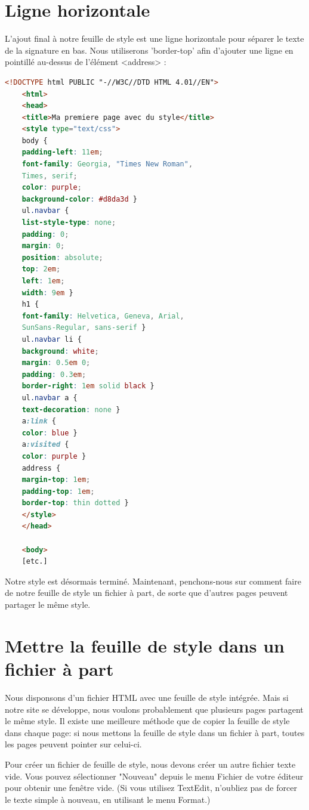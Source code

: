 \section{Ligne horizontale}
L'ajout final à notre feuille de style est une ligne horizontale pour séparer le texte de la signature en bas. Nous utiliserons 'border-top' afin d'ajouter une ligne en pointillé au-dessus de l'élément <address> : 
\begin{lstlisting}[language=html]
	<!DOCTYPE html PUBLIC "-//W3C//DTD HTML 4.01//EN">
	<html>
	<head>
	<title>Ma premiere page avec du style</title>
	<style type="text/css">
	body {
	padding-left: 11em;
	font-family: Georgia, "Times New Roman",
	Times, serif;
	color: purple;
	background-color: #d8da3d }
	ul.navbar {
	list-style-type: none;
	padding: 0;
	margin: 0;
	position: absolute;
	top: 2em;
	left: 1em;
	width: 9em }
	h1 {
	font-family: Helvetica, Geneva, Arial,
	SunSans-Regular, sans-serif }
	ul.navbar li {
	background: white;
	margin: 0.5em 0;
	padding: 0.3em;
	border-right: 1em solid black }
	ul.navbar a {
	text-decoration: none }
	a:link {
	color: blue }
	a:visited {
	color: purple }
	address {
	margin-top: 1em;
	padding-top: 1em;
	border-top: thin dotted }
	</style>
	</head>
	
	<body>
	[etc.]
\end{lstlisting}
Notre style est désormais terminé. Maintenant, penchons-nous sur comment faire de notre feuille de style un fichier à part, de sorte que d'autres pages peuvent partager le même style. 
\section{Mettre la feuille de style dans un fichier à part}
Nous disponsons d'un fichier HTML avec une feuille de style intégrée. Mais si notre site se développe, nous voulons probablement que plusieurs pages partagent le même style. Il existe une meilleure méthode que de copier la feuille de style dans chaque page: si nous mettons la feuille de style dans un fichier à part, toutes les pages peuvent pointer sur celui-ci.

Pour créer un fichier de feuille de style, nous devons créer un autre fichier texte vide. Vous pouvez sélectionner "Nouveau" depuis le menu Fichier de votre éditeur pour obtenir une fenêtre vide. (Si vous utilisez TextEdit, n'oubliez pas de forcer le texte simple à nouveau, en utilisant le menu Format.)

